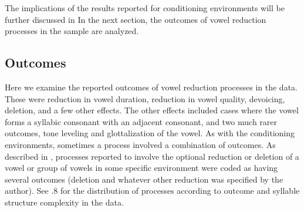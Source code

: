   The implications of the results reported for conditioning environments will be further discussed in  In the next section, the outcomes of vowel reduction processes in the sample are analyzed.

\subsection{Outcomes}\label{sec:6.3.5}

  Here we examine the reported outcomes of vowel reduction processes in the data. These were reduction in vowel duration, reduction in vowel quality, devoicing, deletion, and a few other effects. The other effects included cases where the vowel forms a syllabic consonant with an adjacent consonant, and two much rarer outcomes, tone leveling and glottalization of the vowel. As with the conditioning environments, sometimes a process involved a combination of outcomes. As described in , processes reported to involve the optional reduction or deletion of a vowel or group of vowels in some specific environment were coded as having several outcomes (deletion and whatever other reduction was specified by the author). See .8 for the distribution of processes according to outcome and syllable structure complexity in the data.

